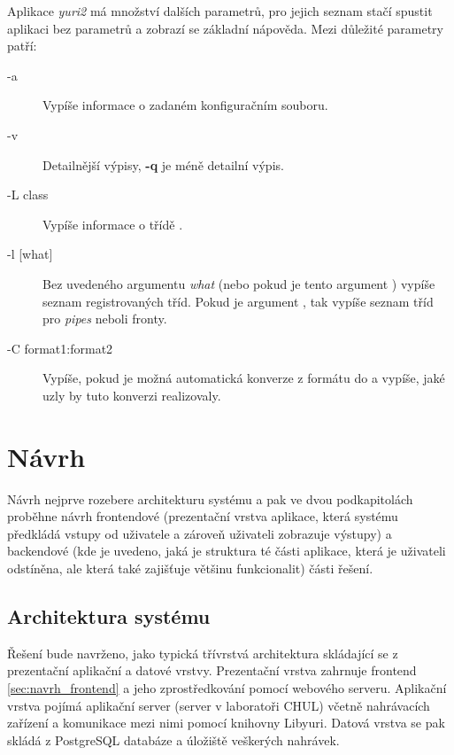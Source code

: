 \documentclass[thesis=M,czech]{FITthesis}[2012/06/26]
\begin{document}
\begin{description}
Aplikace \textit{yuri2} má množství dalších parametrů, pro jejich seznam stačí spustit aplikaci bez parametrů a zobrazí se základní nápověda. Mezi důležité parametry patří:

\begin{description}
	\item[-a] Vypíše informace o zadaném konfiguračním souboru.
	\item[-v] Detailnější výpisy, \textbf{-q} je méně detailní výpis.
	\item[-L class] Vypíše informace o třídě .
	\item[-l {[what]}] Bez uvedeného argumentu \textit{what} (nebo pokud je tento argument ) vypíše seznam registrovaných tříd. Pokud je argument , tak vypíše seznam tříd pro \textit{pipes} neboli fronty.
	\item[-C format1:format2] Vypíše, pokud je možná automatická konverze z formátu  do  a vypíše, jaké uzly by tuto konverzi realizovaly.
\end{description}

\end{description}


\chapter{Návrh} \label{chap:navrh}
Návrh nejprve rozebere architekturu systému a pak ve dvou podkapitolách proběhne návrh frontendové (prezentační vrstva aplikace, která systému předkládá vstupy od uživatele a zároveň uživateli zobrazuje výstupy) a backendové (kde je uvedeno, jaká je struktura té části aplikace, která je uživateli odstíněna, ale která také zajišťuje většinu funkcionalit) části řešení.

\section{Architektura systému} \label{sec:navrh_architektura}
Řešení bude navrženo, jako typická třívrstvá architektura skládající se z prezentační aplikační a datové vrstvy. Prezentační vrstva zahrnuje frontend \ref{sec:navrh_frontend} a jeho zprostředkování pomocí webového serveru. Aplikační vrstva pojímá aplikační server (server v laboratoři CHUL) včetně nahrávacích zařízení a komunikace mezi nimi pomocí knihovny Libyuri. Datová vrstva se pak skládá z PostgreSQL databáze a úložiště veškerých nahrávek.
\end{document}
